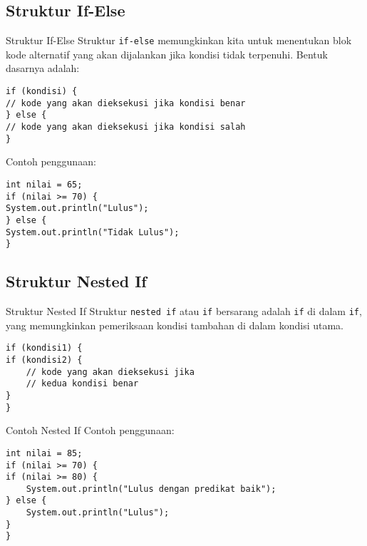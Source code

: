 \documentclass[aspectratio=169, table]{beamer}
\begin{document}
\subsection{Struktur If-Else}
\begin{frame}[fragile]{Struktur If-Else}
\vspace{20pt}
Struktur \texttt{if-else} memungkinkan kita untuk menentukan blok kode alternatif yang akan dijalankan jika kondisi tidak terpenuhi. Bentuk dasarnya adalah:

\begin{lstlisting}[style=JavaStyle]
if (kondisi) {
// kode yang akan dieksekusi jika kondisi benar
} else {
// kode yang akan dieksekusi jika kondisi salah
}
\end{lstlisting}

Contoh penggunaan:

\begin{lstlisting}[style=JavaStyle]
int nilai = 65;
if (nilai >= 70) {
System.out.println("Lulus");
} else {
System.out.println("Tidak Lulus");
}
\end{lstlisting}
\end{frame}

\subsection{Struktur Nested If}
\begin{frame}[fragile]{Struktur Nested If}
\vspace{20pt}
Struktur \texttt{nested if} atau \texttt{if} bersarang adalah \texttt{if} di dalam \texttt{if}, yang memungkinkan pemeriksaan kondisi tambahan di dalam kondisi utama.

\begin{lstlisting}[style=JavaStyle]
if (kondisi1) {
if (kondisi2) {
	// kode yang akan dieksekusi jika 
	// kedua kondisi benar
}
}
\end{lstlisting}
\end{frame}

\begin{frame}[fragile]{Contoh Nested If}
\vspace{20pt}
Contoh penggunaan:
\begin{lstlisting}[style=JavaStyle]
int nilai = 85;
if (nilai >= 70) {
if (nilai >= 80) {
	System.out.println("Lulus dengan predikat baik");
} else {
	System.out.println("Lulus");
}
}
\end{lstlisting}
\end{frame}
\end{document}
